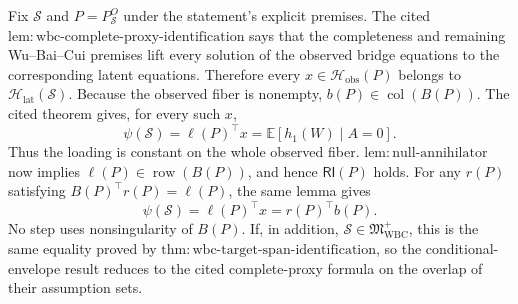 Fix \(\mathcal S\) and \(P=P_{\mathcal S}^O\) under the statement's
explicit premises.  The cited
\(\mathrm{lem{:}wbc\text{-}complete\text{-}proxy\text{-}identification}\) says
that the completeness and remaining Wu--Bai--Cui premises lift every solution of
the observed bridge equations to the corresponding latent equations.  Therefore
every \(x\in\mathcal H_{\mathrm{obs}}(P)\) belongs to
\(\mathcal H_{\mathrm{lat}}(\mathcal S)\).  Because the observed fiber is
nonempty, \(b(P)\in\operatorname{col}(B(P))\).  The cited theorem gives, for
every such \(x\),
\[
 \psi(\mathcal S)=\ell(P)^\top x
 =\mathbb E[h_1(W)\mid A=0].
\]
Thus the loading is constant on the whole observed fiber.
\(\mathrm{lem{:}null\text{-}annihilator}\) now implies
\(\ell(P)\in\operatorname{row}(B(P))\), and hence
\(\mathsf{RI}(P)\) holds.  For any \(r(P)\) satisfying
\(B(P)^\top r(P)=\ell(P)\), the same lemma gives
\[
 \psi(\mathcal S)=\ell(P)^\top x=r(P)^\top b(P).
\]
No step uses nonsingularity of \(B(P)\).  If, in addition,
\(\mathcal S\in\mathfrak M_{\mathrm{WBC}}^+\), this is the same equality proved
by \(\mathrm{thm{:}wbc\text{-}target\text{-}span\text{-}identification}\), so
the conditional-envelope result reduces to the cited complete-proxy formula on
the overlap of their assumption sets.